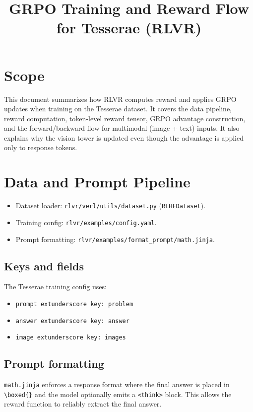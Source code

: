 \documentclass[11pt]{article}
\title{GRPO Training and Reward Flow for Tesserae (RLVR)}
\author{}
\date{}
\begin{document}
\maketitle

\section{Scope}
This document summarizes how RLVR computes reward and applies GRPO updates when training on the Tesserae dataset. It covers the data pipeline, reward computation, token-level reward tensor, GRPO advantage construction, and the forward/backward flow for multimodal (image + text) inputs. It also explains why the vision tower is updated even though the advantage is applied only to response tokens.

\section{Data and Prompt Pipeline}
\begin{itemize}
  \item Dataset loader: \texttt{rlvr/verl/utils/dataset.py} (\texttt{RLHFDataset}).
  \item Training config: \texttt{rlvr/examples/config.yaml}.
  \item Prompt formatting: \texttt{rlvr/examples/format_prompt/math.jinja}.
\end{itemize}

\subsection{Keys and fields}
The Tesserae training config uses:
\begin{itemize}
  \item \texttt{prompt	extunderscore key: problem}
  \item \texttt{answer	extunderscore key: answer}
  \item \texttt{image	extunderscore key: images}
\end{itemize}

\subsection{Prompt formatting}
\texttt{math.jinja} enforces a response format where the final answer is placed in \texttt{\textbackslash boxed\{\}} and the model optionally emits a \texttt{<think>} block. This allows the reward function to reliably extract the final answer.
\end{document}
